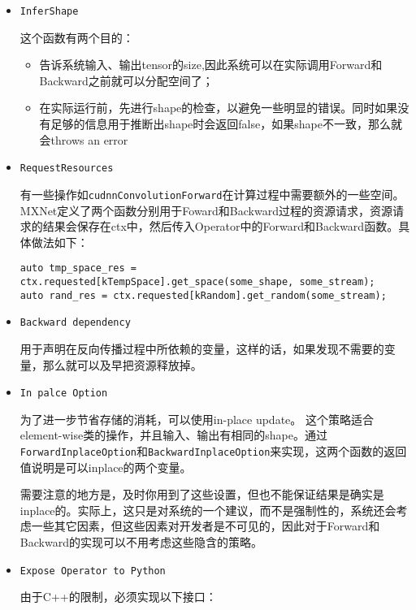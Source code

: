 \begin{itemize}
\item \verb|InferShape|

这个函数有两个目的：

\begin{itemize}
\item 告诉系统输入、输出tensor的size,因此系统可以在实际调用Forward和Backward之前就可以分配空间了；
\item 在实际运行前，先进行shape的检查，以避免一些明显的错误。同时如果没有足够的信息用于推断出shape时会返回false，如果shape不一致，那么就会throws an error
\end{itemize}

\item \verb|RequestResources|

有一些操作如\verb|cudnnConvolutionForward|在计算过程中需要额外的一些空间。MXNet定义了两个函数分别用于Foward和Backward过程的资源请求，资源请求的结果会保存在ctx中，然后传入Operator中的Forward和Backward函数。具体做法如下：
\begin{lstlisting}
auto tmp_space_res = ctx.requested[kTempSpace].get_space(some_shape, some_stream);
auto rand_res = ctx.requested[kRandom].get_random(some_stream);
\end{lstlisting}

\item \verb|Backward dependency|

用于声明在反向传播过程中所依赖的变量，这样的话，如果发现不需要的变量，那么就可以及早把资源释放掉。

\item \verb|In palce Option|

为了进一步节省存储的消耗，可以使用in-place update。 这个策略适合 element-wise类的操作，并且输入、输出有相同的shape。通过\verb|ForwardInplaceOption|和\verb|BackwardInplaceOption|来实现，这两个函数的返回值说明是可以inplace的两个变量。

需要注意的地方是，及时你用到了这些设置，但也不能保证结果是确实是inplace的。实际上，这只是对系统的一个建议，而不是强制性的，系统还会考虑一些其它因素，但这些因素对开发者是不可见的，因此对于Forward和Backward的实现可以不用考虑这些隐含的策略。

\item \verb|Expose Operator to Python|

由于C++的限制，必须实现以下接口：


\end{itemize}
